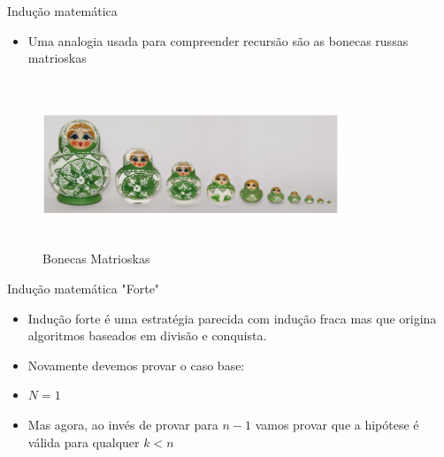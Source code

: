 \begin{frame}
	\begin{block}{Indução matemática}
		\begin{itemize}
			\item Uma analogia usada para compreender recursão são as bonecas russas matrioskas
		\end{itemize}
		 \begin{figure}[!htb]
			\centering	  				
			\includegraphics[height=5cm, width = 9cm]{./pic/nmatrioskas.png}
			\caption{Bonecas Matrioskas \cite{KHAN}}
			\label{fig_matrioskas}
		\end{figure}
	\end{block}
\end{frame}

\begin{frame}
	\begin{block}{Indução matemática "Forte"}
		\begin{itemize}
			\item Indução forte é uma estratégia parecida com indução fraca mas que origina algoritmos baseados em divisão e conquista.

			\item Novamente devemos provar o caso base:
			
			\item $N = 1$
			
			\item Mas agora, ao invés de provar para $n-1$ vamos provar que a hipótese é válida para qualquer $k<n$
		\end{itemize}
	\end{block}
\end{frame}

